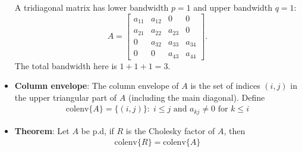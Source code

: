 \documentclass{report}
\begin{document}
\begin{itemize}
                \bigbreak \noindent 
                A tridiagonal matrix has lower bandwidth $p=1$ and upper bandwidth $q=1$:
                \[
                    A =
                    \begin{bmatrix}
                        a_{11} & a_{12} & 0      & 0      \\
                        a_{21} & a_{22} & a_{23} & 0      \\
                        0      & a_{32} & a_{33} & a_{34} \\
                        0      & 0      & a_{43} & a_{44}
                    \end{bmatrix}.
                \]
                The total bandwidth here is $1 + 1 + 1 = 3$.

        \item \textbf{Column envelope}: The column envelope of $A $ is the set of indices $(i,j)$ in the upper triangular part of $A$ (including the main diagonal). Define
            \begin{align*}
            \text{colenv}\{A\} = \{(i,j)\} :\; i \leq j \text{ and } a_{kj} \ne 0 \text{ for } k \leq i
            \end{align*}
        \item \textbf{Theorem}: Let $A$ be p.d, if $R$ is the Cholesky factor of $A$, then
            \begin{align*}
                \text{colenv}\{R\}  = \text{colenv}\{A\}
            \end{align*}
    \end{itemize}

    \pagebreak 
\end{document}
